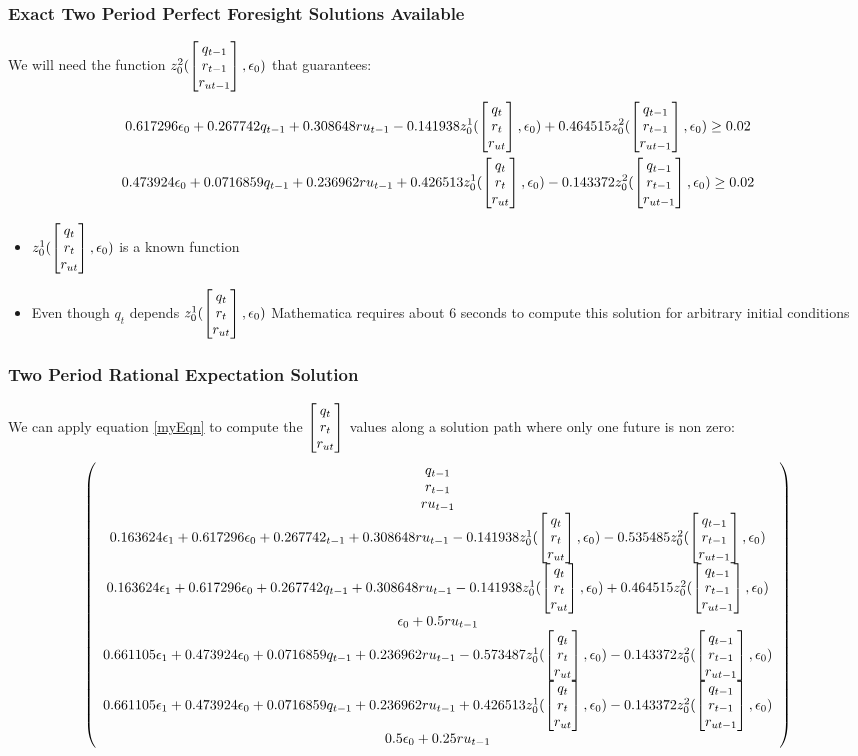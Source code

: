 \documentclass{beamer}
\begin{document}
    \begin{frame}
\frametitle{Exact Two Period Perfect Foresight Solutions  Available}

We will need the function {\small $z_0^2(\begin{bmatrix} q_{t-1}\\r_{t-1}\\r_{ut-1} \end{bmatrix},\epsilon_0)$ }that guarantees:
{\tiny 
\begin{gather*}
    0.617296 \epsilon_0+0.267742 q_{t-1}+0.308648 ru_{t-1}-0.141938
      z_0^1(\begin{bmatrix} q_t\\r_{t}\\r_{ut} \end{bmatrix},\epsilon_0)+0.464515 z_0^2(\begin{bmatrix} q_{t-1}\\r_{t-1}\\r_{ut-1} \end{bmatrix},\epsilon_0) \ge 0.02\\  
    0.473924 \epsilon_0+0.0716859 q_{t-1}+0.236962 ru_{t-1}+0.426513
      z_0^1(\begin{bmatrix} q_t\\r_{t}\\r_{ut} \end{bmatrix},\epsilon_0)-0.143372 z_0^2(\begin{bmatrix} q_{t-1}\\r_{t-1}\\r_{ut-1} \end{bmatrix},\epsilon_0)  \ge 0.02 \\
\end{gather*}
}
\begin{itemize}
\item {\small $z_0^1(\begin{bmatrix} q_t\\r_{t}\\r_{ut} \end{bmatrix},\epsilon_0)$ } is a known function
\item Even though $q_t$ depends {\small $z_0^1(\begin{bmatrix} q_t\\r_{t}\\r_{ut} \end{bmatrix},\epsilon_0)$ } Mathematica requires about 6 seconds to compute this solution for arbitrary initial conditions
\end{itemize}
    \end{frame}

    \begin{frame}
      \frametitle{Two Period Rational Expectation Solution}
We can apply equation \ref{myEqn} to compute the $\begin{bmatrix} q_t\\r_{t}\\r_{ut} \end{bmatrix}$ values along a solution path where only one future is non zero:
{\tiny
      \begin{gather*}
           \left(
   \begin{array}{c}
    q_{t-1} \\
    r_{t-1} \\
    ru_{t-1} \\
  0.163624 \epsilon_{1}+0.617296 \epsilon_0+0.267742 _{t-1}+0.308648 ru_{t-1}-0.141938
       z_0^1(\begin{bmatrix} q_t\\r_{t}\\r_{ut} \end{bmatrix},\epsilon_0)-0.535485 z_0^2(\begin{bmatrix} q_{t-1}\\r_{t-1}\\r_{ut-1} \end{bmatrix},\epsilon_0) \\
    0.163624 \epsilon_{1}+0.617296 \epsilon_0+0.267742 q_{t-1}+0.308648 ru_{t-1}-0.141938
      z_0^1(\begin{bmatrix} q_t\\r_{t}\\r_{ut} \end{bmatrix},\epsilon_0)+0.464515 z_0^2(\begin{bmatrix} q_{t-1}\\r_{t-1}\\r_{ut-1} \end{bmatrix},\epsilon_0) \\
    \epsilon_0+0.5 ru_{t-1} \\
    0.661105 \epsilon_{1}+0.473924 \epsilon_0+0.0716859 q_{t-1}+0.236962 ru_{t-1}-0.573487
      z_0^1(\begin{bmatrix} q_t\\r_{t}\\r_{ut} \end{bmatrix},\epsilon_0)-0.143372 z_0^2(\begin{bmatrix} q_{t-1}\\r_{t-1}\\r_{ut-1} \end{bmatrix},\epsilon_0) \\
   0.661105 \epsilon_{1}+ 0.473924 \epsilon_0+0.0716859 q_{t-1}+0.236962 ru_{t-1}+0.426513
      z_0^1(\begin{bmatrix} q_t\\r_{t}\\r_{ut} \end{bmatrix},\epsilon_0)-0.143372 z_0^2(\begin{bmatrix} q_{t-1}\\r_{t-1}\\r_{ut-1} \end{bmatrix},\epsilon_0) \\
    0.5 \epsilon_0+0.25 ru_{t-1} 
   \end{array}
   \right)
      \end{gather*}
}

    \end{frame}
\end{document}
